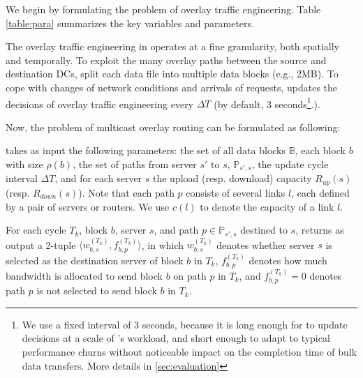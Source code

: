 We begin by formulating the problem of overlay traffic engineering.
Table \ref{table:para} summarizes the key variables and parameters.

The overlay traffic engineering in \name operates at a
fine granularity, both spatially and temporally. To exploit the many
overlay paths between the source and destination DCs, \name split
each data file into multiple data blocks (e.g., 2MB).
To cope with changes of network conditions and arrivals of requests,
\name updates the decisions of overlay traffic engineering every
$\Delta T$ (by default, 3 seconds\footnote{We use a fixed interval of
3 seconds, because it is long enough for \name to update decisions at
a scale of \company's workload, and short enough to adapt to typical
performance churns without noticeable impact on the completion time
of bulk data transfers.
More details in \Section\ref{sec:evaluation}}.).


Now, the problem of multicast overlay routing can be formulated as
following:

 \name takes as input the following parameters:
the set of all data blocks $\mathbb{B}$, each block $b$ with size
$\rho(b)$, the set of paths from server $s'$ to $s$,
$\mathbb{P}_{s',s}$, the update cycle interval $\Delta T$, and for
each server $s$ the upload (resp. download) capacity $R_{up}(s)$
(resp. $R_{down}(s)$). Note that each path $p$ consists of several
links $l$, each defined by a pair of servers or routers. We use
$c(l)$ to denote the capacity of a link $l$.

 For each cycle $T_{k}$, block $b$, server $s$, and
path $p\in\mathbb{P}_{s',s}$ destined to $s$, \name returns as output
a 2-tuple $\langle w^{(T_k)}_{b,s}, f_{b,p}^{(T_k)} \rangle$, in which $w^{(T_k)}_{b,s}$ denotes whether server $s$ is
selected as the destination server of block $b$ in $T_k$,
$f_{b,p}^{(T_k)}$ denotes how much bandwidth is allocated to send
block $b$ on path $p$ in $T_k$, and $f_{b,p}^{(T_k)}=0$ denotes 
path $p$ is not selected to send block $b$ in $T_k$.

